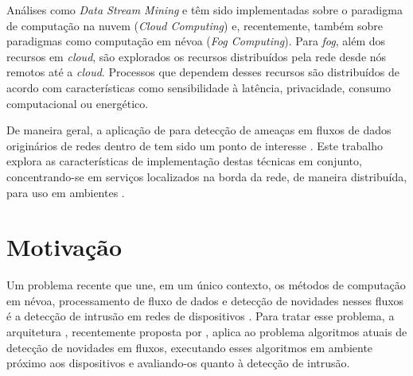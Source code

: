 Análises como \emph{Data Stream Mining} e \nd têm sido implementadas sobre
o paradigma de computação na nuvem (\emph{Cloud Computing}) e, recentemente,
também sobre paradigmas como computação em névoa (\emph{Fog Computing}).
Para \emph{fog}, além dos recursos em \emph{cloud}, são explorados os recursos
distribuídos pela rede desde nós remotos até a \emph{cloud}.
Processos que dependem desses recursos são distribuídos de acordo com
características como sensibilidade à latência, privacidade, consumo
computacional ou energético.

De maneira geral, a aplicação de \nd para detecção de ameaças em fluxos de dados
originários de redes \iot dentro de \nids tem sido um ponto de interesse
\cite{Viegas2019,AndreoniLopez2019,DaCosta2019a}.
Este trabalho explora as características de implementação destas técnicas
em conjunto, concentrando-se em serviços localizados na borda da rede, de maneira
distribuída, para uso em ambientes \iot.



\section{Motivação}\label{sec:motivo}


Um problema recente que une, em um único contexto, os métodos de computação em
névoa, processamento de fluxo de dados e detecção de novidades nesses fluxos é a
detecção de intrusão em redes de dispositivos \iot.
Para tratar esse problema, a arquitetura \arch, recentemente proposta por
, aplica ao problema algoritmos 
atuais     %
de detecção de
novidades em fluxos, executando esses algoritmos em ambiente próximo aos
dispositivos e avaliando-os quanto à detecção de intrusão.

